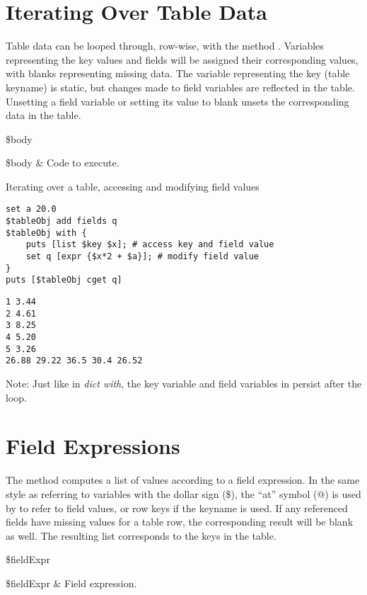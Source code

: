 \documentclass{article}
\begin{document}
\section{Iterating Over Table Data}
Table data can be looped through, row-wise, with the method . 
Variables representing the key values and fields will be assigned their corresponding values, with blanks representing missing data. 
The variable representing the key (table keyname) is static, but changes made to field variables are reflected in the table. 
Unsetting a field variable or setting its value to blank unsets the corresponding data in the table. 
\begin{syntax}
 \$body
\end{syntax}
\begin{args}
\$body & Code to execute.
\end{args}
\begin{example}{Iterating over a table, accessing and modifying field values}
\begin{lstlisting}
set a 20.0
$tableObj add fields q
$tableObj with {
    puts [list $key $x]; # access key and field value
    set q [expr {$x*2 + $a}]; # modify field value
}
puts [$tableObj cget q]
\end{lstlisting}
\tcblower
\begin{lstlisting}
1 3.44
2 4.61
3 8.25
4 5.20
5 3.26
26.88 29.22 36.5 30.4 26.52
\end{lstlisting}
\end{example}
Note: Just like in \textit{dict with}, the key variable and field variables in  persist after the loop.
\clearpage
\section{Field Expressions}
The method  computes a list of values according to a field expression. 
In the same style as referring to variables with the dollar sign (\$), the ``at'' symbol (@) is used by  to refer to field values, or row keys if the keyname is used. 
If any referenced fields have missing values for a table row, the corresponding result will be blank as well. 
The resulting list corresponds to the keys in the table.
\begin{syntax}
 \$fieldExpr
\end{syntax}
\begin{args}
\$fieldExpr & Field expression.
\end{args}
\end{document}
